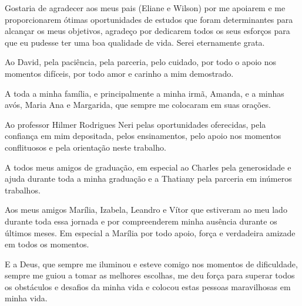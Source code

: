 \begin{agradecimentos}

Gostaria de agradecer aos meus pais (Eliane e Wilson) por me apoiarem e me proporcionarem ótimas oportunidades
de estudos que foram determinantes para alcançar os meus objetivos,  agradeço por dedicarem todos os seus esforços para que eu pudesse ter uma boa qualidade de vida.
Serei eternamente grata.

Ao David, pela paciência, pela parceria, pelo cuidado, por todo o apoio nos momentos difíceis, por todo amor e carinho a mim demostrado.

A toda a minha família, e principalmente a minha irmã, Amanda, e a minhas avós, Maria Ana e Margarida, que sempre me colocaram em suas orações.

Ao professor Hilmer Rodrigues Neri pelas oportunidades oferecidas, pela confiança em mim depositada, pelos ensinamentos, pelo apoio nos momentos conflituosos e pela orientação neste trabalho.

A todos meus amigos de graduação, em especial ao Charles pela generosidade e ajuda durante toda a minha graduação e a Thatiany pela parceria em inúmeros trabalhos.

Aos meus amigos Marília, Izabela, Leandro e Vítor que estiveram ao meu lado durante toda essa jornada e por compreenderem minha ausência durante os últimos meses. Em especial a Marília por todo apoio, força e verdadeira amizade em todos os momentos.

E a Deus, que sempre me iluminou e esteve comigo nos momentos de dificuldade, sempre me guiou a tomar as melhores escolhas, me deu força para superar todos os obstáculos e 
desafios da minha vida e colocou estas pessoas maravilhosas em minha vida.

\end{agradecimentos}

